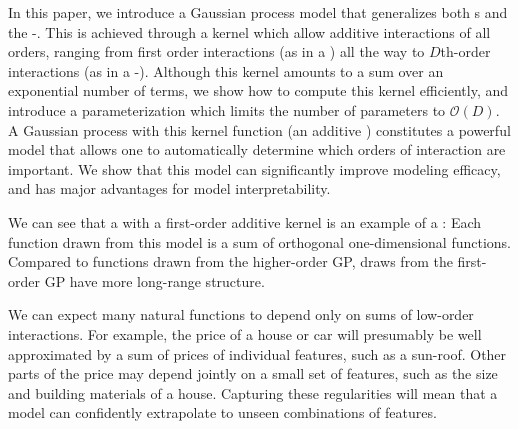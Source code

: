 In this paper, we introduce a Gaussian process model that generalizes both \GAM{}s and the \SE-\gp{}.
This is achieved through a kernel which allow additive interactions of all orders, ranging from first order interactions (as in a \GAM{}) all the way to $D$th-order interactions (as in a \SE-\gp{}).
Although this kernel amounts to a sum over an exponential number of terms, we show how to compute this kernel efficiently, and introduce a parameterization which limits the number of parameters to $\mathcal{O}(D)$.
A Gaussian process with this kernel function (an additive \gp{}) constitutes a powerful model that allows one to automatically determine which orders of interaction are important.
We show that this model can significantly improve modeling efficacy, and has major advantages for model interpretability.



We can see that a \gp{} with a first-order additive kernel is an example of a \GAM{}:  Each function drawn from this model is a sum of orthogonal one-dimensional functions.  Compared to functions drawn from the higher-order GP, draws from the first-order GP have more long-range structure.



We can expect many natural functions to depend only on sums of low-order interactions.
For example, the price of a house or car will presumably be well approximated by a sum of prices of individual features, such as a sun-roof.  
Other parts of the price may depend jointly on a small set of features, such as the size and building materials of a house.
Capturing these regularities will mean that a model can confidently extrapolate to unseen combinations of features.



